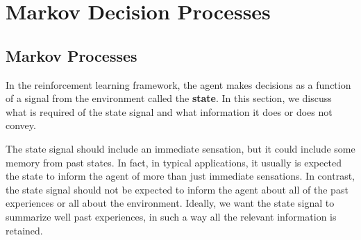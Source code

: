 
\chapter{Markov Decision Processes}

\section{Markov Processes}

In the reinforcement learning framework, the agent makes decisions as a function of a signal from the environment called the \textbf{state}. In this section, we discuss what is required of the state signal and what information it does or does not convey.

The state signal should include an immediate sensation, but it could include some memory from past states. In fact, in typical applications, it usually is expected the state to inform the agent of more than just immediate sensations. In contrast, the state signal should not be expected to inform the agent about all of the past experiences or all about the environment. Ideally, we want the state signal to summarize well past experiences, in such a way all the relevant information is retained. 


